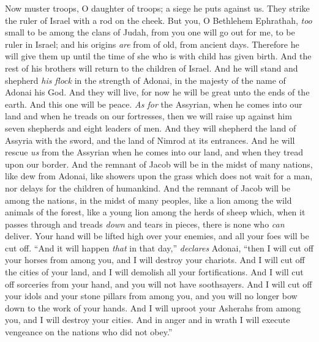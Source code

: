 \begin{biblechapter} %
  Now muster troops, O daughter of troops; 
a siege he puts against us. 
They strike the ruler of Israel 
with a rod on the cheek.
\verse But you, O Bethlehem Ephrathah, 
\textit{too} small to be among the clans of Judah, 
from you one will go out for me, 
to be ruler in Israel; 
and his origins \textit{are} from of old, 
from ancient days.
\verse Therefore he will give them up 
until the time of she who is with child has given birth. 
And the rest of his brothers will return 
to the children of Israel.
\verse And he will stand and shepherd \textit{his flock} 
in the strength of Adonai, 
in the majesty of the name of Adonai his God. 
And they will live, 
for now he will be great unto the ends of the earth.
\verse And this one will be peace. 
\textit{As for} the Assyrian, when he comes into our land 
and when he treads on our fortresses, 
then we will raise up against him seven shepherds 
and eight leaders of men.
\verse And they will shepherd the land of Assyria with the sword, 
and the land of Nimrod at its entrances. 
And he will rescue \textit{us} from the Assyrian 
when he comes into our land, 
and when they tread upon our border.
 And the remnant of Jacob will be 
in the midst of many nations, 
like dew from Adonai, 
like showers upon the grass 
which does not wait for a man, 
nor delays for the children of humankind.
\verse And the remnant of Jacob will be among the nations, 
in the midst of many peoples, 
like a lion among the wild animals of the forest, 
like a young lion among the herds of sheep 
which, when it passes through and treads \textit{down} 
and tears in pieces, there is none who \textit{can} deliver.
\verse Your hand will be lifted high over your enemies, 
and all your foes will be cut off.
\verse “And it will happen \textit{that} in that day,” \textit{declares} Adonai, 
“then I will cut off your horses from among you, 
and I will destroy your chariots.
\verse And I will cut off the cities of your land, 
and I will demolish all your fortifications.
\verse And I will cut off sorceries from your hand, 
and you will not have soothsayers.
\verse And I will cut off your idols 
and your stone pillars from among you, 
and you will no longer bow down 
to the work of your hands.
\verse And I will uproot your Asherahs from among you, 
and I will destroy your cities.
\verse And in anger and in wrath I will execute vengeance 
on the nations who did not obey.”
\end{biblechapter}

